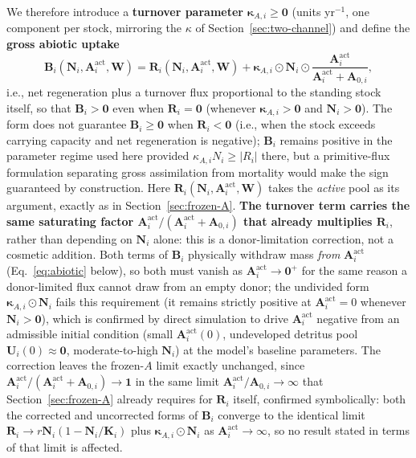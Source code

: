 \documentclass[twocolumn,10pt]{article}
\begin{document}
We therefore introduce a \textbf{turnover parameter} $\boldsymbol\kappa_{A,i}\ge\mathbf 0$ (units yr$^{-1}$, one component per stock, mirroring the $\kappa$ of Section~\ref{sec:two-channel}) and define the \textbf{gross abiotic uptake}
\[
\mathbf{B}_i(\mathbf{N}_i,\mathbf A^{\text{act}}_i,\mathbf{W}) = \mathbf{R}_i(\mathbf{N}_i,\mathbf A^{\text{act}}_i,\mathbf{W}) + \boldsymbol\kappa_{A,i}\odot\mathbf{N}_i\odot\frac{\mathbf A^{\text{act}}_i}{\mathbf A^{\text{act}}_i+\mathbf A_{0,i}},
\]
i.e., net regeneration plus a turnover flux proportional to the standing stock itself, so that $\mathbf B_i>\mathbf 0$ even when $\mathbf R_i=\mathbf 0$ (whenever $\boldsymbol\kappa_{A,i}>\mathbf 0$ and $\mathbf N_i>\mathbf 0$). The form does not guarantee $\mathbf B_i\ge\mathbf 0$ when $\mathbf R_i<\mathbf 0$ (i.e., when the stock exceeds carrying capacity and net regeneration is negative); $\mathbf B_i$ remains positive in the parameter regime used here provided $\kappa_{A,i}N_i\ge|R_i|$ there, but a primitive-flux formulation separating gross assimilation from mortality would make the sign guaranteed by construction. Here $\mathbf R_i(\mathbf N_i,\mathbf A^{\text{act}}_i,\mathbf W)$ takes the \emph{active} pool as its argument, exactly as in Section~\ref{sec:frozen-A}. \textbf{The turnover term carries the same saturating factor $\mathbf A^{\text{act}}_i/(\mathbf A^{\text{act}}_i+\mathbf A_{0,i})$ that already multiplies $\mathbf R_i$}, rather than depending on $\mathbf N_i$ alone: this is a donor-limitation correction, not a cosmetic addition. Both terms of $\mathbf B_i$ physically withdraw mass \emph{from} $\mathbf A^{\text{act}}_i$ (Eq.~\eqref{eq:abiotic} below), so both must vanish as $\mathbf A^{\text{act}}_i\to\mathbf 0^+$ for the same reason a donor-limited flux cannot draw from an empty donor; the undivided form $\boldsymbol\kappa_{A,i}\odot\mathbf N_i$ fails this requirement (it remains strictly positive at $\mathbf A^{\text{act}}_i=0$ whenever $\mathbf N_i>\mathbf 0$), which is confirmed by direct simulation to drive $\mathbf A^{\text{act}}_i$ negative from an admissible initial condition (small $\mathbf A^{\text{act}}_i(0)$, undeveloped detritus pool $\mathbf U_i(0)\approx\mathbf 0$, moderate-to-high $\mathbf N_i$) at the model's baseline parameters. The correction leaves the frozen-$A$ limit exactly unchanged, since $\mathbf A^{\text{act}}_i/(\mathbf A^{\text{act}}_i+\mathbf A_{0,i})\to\mathbf 1$ in the same limit $\mathbf A^{\text{act}}_i/\mathbf A_{0,i}\to\infty$ that Section~\ref{sec:frozen-A} already requires for $\mathbf R_i$ itself, confirmed symbolically: both the corrected and uncorrected forms of $\mathbf B_i$ converge to the identical limit $\mathbf R_i\to r\mathbf N_i(1-\mathbf N_i/\mathbf K_i)$ plus $\boldsymbol\kappa_{A,i}\odot\mathbf N_i$ as $\mathbf A^{\text{act}}_i\to\infty$, so no result stated in terms of that limit is affected.
\end{document}
